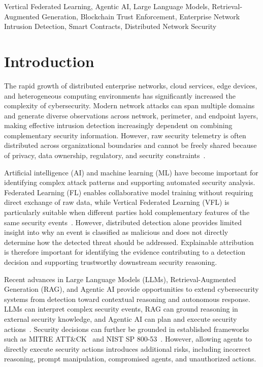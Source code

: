 \documentclass[10pt, conference]{IEEEtran}
\begin{document}
 
\begin{IEEEkeywords}
Vertical Federated Learning,
Agentic AI,
Large Language Models,
Retrieval-Augmented Generation,
Blockchain Trust Enforcement,
Enterprise Network Intrusion Detection,
Smart Contracts,
Distributed Network Security
\end{IEEEkeywords}
 


\section{Introduction}

The rapid growth of distributed enterprise networks, cloud services, edge devices, and heterogeneous computing environments has significantly increased the complexity of cybersecurity. Modern network attacks can span multiple domains and generate diverse observations across network, perimeter, and endpoint layers, making effective intrusion detection increasingly dependent on combining complementary security information. However, raw security telemetry is often distributed across organizational boundaries and cannot be freely shared because of privacy, data ownership, regulatory, and security constraints~\cite{sharafaldin2018,nist80053,nist800207}.

Artificial intelligence (AI) and machine learning (ML) have become important for identifying complex attack patterns and supporting automated security analysis. Federated Learning (FL) enables collaborative model training without requiring direct exchange of raw data, while Vertical Federated Learning (VFL) is particularly suitable when different parties hold complementary features of the same security events~\cite{liu2024vfl,folino2024}. However, distributed detection alone provides limited insight into why an event is classified as malicious and does not directly determine how the detected threat should be addressed. Explainable attribution is therefore important for identifying the evidence contributing to a detection decision and supporting trustworthy downstream security reasoning.

Recent advances in Large Language Models (LLMs), Retrieval-Augmented Generation (RAG), and Agentic AI provide opportunities to extend cybersecurity systems from detection toward contextual reasoning and autonomous response. LLMs can interpret complex security events, RAG can ground reasoning in external security knowledge, and Agentic AI can plan and execute security actions~\cite{xi2023,li2025,shajarian2026,fu2026}. Security decisions can further be grounded in established frameworks such as MITRE ATT\&CK~\cite{mitre_attack} and NIST SP 800-53~\cite{nist80053}. However, allowing agents to directly execute security actions introduces additional risks, including incorrect reasoning, prompt manipulation, compromised agents, and unauthorized actions.
\end{document}
